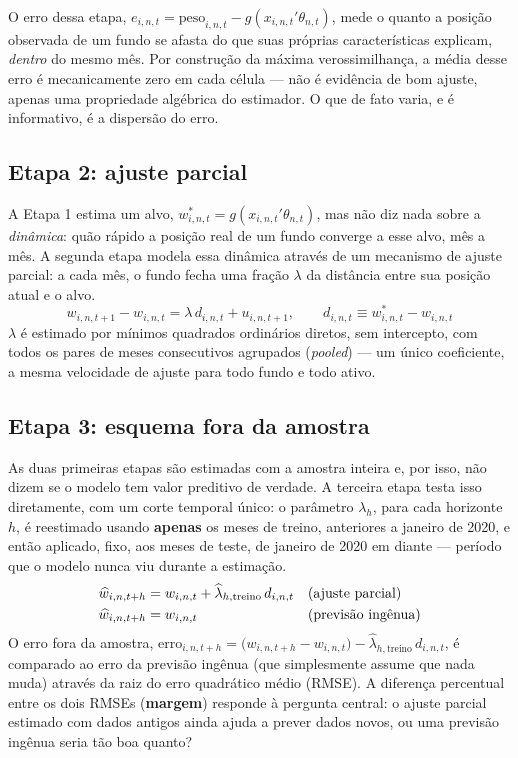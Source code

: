 \documentclass[11pt,a4paper]{article}
\begin{document}
O erro dessa etapa, $e_{i,n,t} = \text{peso}_{i,n,t} - g(x_{i,n,t}'\theta_{n,t})$, mede o quanto
a posição observada de um fundo se afasta do que suas próprias características explicam,
\emph{dentro} do mesmo mês. Por construção da máxima verossimilhança, a média desse erro é
mecanicamente zero em cada célula --- não é evidência de bom ajuste, apenas uma propriedade
algébrica do estimador. O que de fato varia, e é informativo, é a dispersão do erro.

\FloatBarrier
\subsection{Etapa 2: ajuste parcial}

A Etapa 1 estima um alvo, $w^*_{i,n,t} = g(x_{i,n,t}'\theta_{n,t})$, mas não diz nada sobre a
\emph{dinâmica}: quão rápido a posição real de um fundo converge a esse alvo, mês a mês. A
segunda etapa modela essa dinâmica através de um mecanismo de ajuste parcial: a cada mês, o
fundo fecha uma fração $\lambda$ da distância entre sua posição atual e o alvo.
\begin{equation}
w_{i,n,t+1} - w_{i,n,t} = \lambda\, d_{i,n,t} + u_{i,n,t+1}, \qquad
d_{i,n,t} \equiv w^*_{i,n,t} - w_{i,n,t}
\label{eq:pa}
\end{equation}
$\lambda$ é estimado por mínimos quadrados ordinários diretos, sem intercepto, com todos os
pares de meses consecutivos agrupados (\emph{pooled}) --- um único coeficiente, a mesma
velocidade de ajuste para todo fundo e todo ativo.

\FloatBarrier
\subsection{Etapa 3: esquema fora da amostra}

As duas primeiras etapas são estimadas com a amostra inteira e, por isso, não dizem se o modelo
tem valor preditivo de verdade. A terceira etapa testa isso diretamente, com um corte temporal
único: o parâmetro $\lambda_h$, para cada horizonte $h$, é reestimado usando \textbf{apenas} os
meses de treino, anteriores a janeiro de 2020, e então aplicado, fixo, aos meses de teste, de
janeiro de 2020 em diante --- período que o modelo nunca viu durante a estimação.
\begin{align}
\widehat w_{i,n,t+h} &= w_{i,n,t} + \widehat\lambda_{h,\text{treino}}\, d_{i,n,t}
&&\text{(ajuste parcial)} \notag\\
\widehat w_{i,n,t+h} &= w_{i,n,t} &&\text{(previsão ingênua)}
\label{eq:oos}
\end{align}
O erro fora da amostra, $\text{erro}_{i,n,t+h} = \big(w_{i,n,t+h}-w_{i,n,t}\big) -
\widehat\lambda_{h,\text{treino}}\, d_{i,n,t}$, é comparado ao erro da previsão ingênua (que
simplesmente assume que nada muda) através da raiz do erro quadrático médio (RMSE). A diferença
percentual entre os dois RMSEs (\textbf{margem}) responde à pergunta central: o ajuste parcial
estimado com dados antigos ainda ajuda a prever dados novos, ou uma previsão ingênua seria tão
boa quanto?
\end{document}

